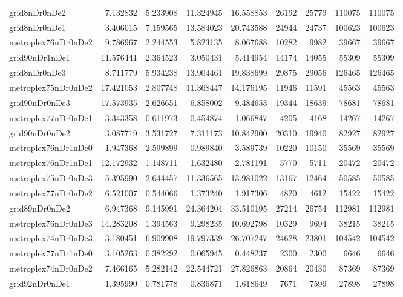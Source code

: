 \begin{longtable}{|l|r|r|r|r|r|r|r|r|}
grid8nDr0nDe2 & 7.132832 & 5.233908 & 11.324945 & 16.558853 & 26192 & 25779 & 110075 & 110075 \\
grid8nDr0nDe1 & 3.406015 & 7.159565 & 13.584023 & 20.743588 & 24944 & 24737 & 100623 & 100623 \\
metroplex76nDr0nDe2 & 9.786967 & 2.244553 & 5.823135 & 8.067688 & 10282 & 9982 & 39667 & 39667 \\
grid90nDr1nDe1 & 11.576441 & 2.364523 & 3.050431 & 5.414954 & 14174 & 14055 & 55309 & 55309 \\
grid8nDr0nDe3 & 8.711779 & 5.934238 & 13.904461 & 19.838699 & 29875 & 29056 & 126465 & 126465 \\
metroplex75nDr0nDe2 & 17.421053 & 2.807748 & 11.368447 & 14.176195 & 11946 & 11591 & 45563 & 45563 \\
grid90nDr0nDe3 & 17.573935 & 2.626651 & 6.858002 & 9.484653 & 19344 & 18639 & 78681 & 78681 \\
metroplex77nDr0nDe1 & 3.343358 & 0.611973 & 0.454874 & 1.066847 & 4205 & 4168 & 14267 & 14267 \\
grid90nDr0nDe2 & 3.087719 & 3.531727 & 7.311173 & 10.842900 & 20310 & 19940 & 82927 & 82927 \\
metroplex76nDr1nDe0 & 1.947368 & 2.599899 & 0.989840 & 3.589739 & 10220 & 10150 & 35569 & 35569 \\
metroplex76nDr1nDe1 & 12.172932 & 1.148711 & 1.632480 & 2.781191 & 5770 & 5711 & 20472 & 20472 \\
metroplex75nDr0nDe3 & 5.395990 & 2.644457 & 11.336565 & 13.981022 & 13167 & 12464 & 50585 & 50585 \\
metroplex77nDr0nDe2 & 6.521007 & 0.544066 & 1.373240 & 1.917306 & 4820 & 4612 & 15422 & 15422 \\
grid89nDr0nDe2 & 6.947368 & 9.145991 & 24.364204 & 33.510195 & 27214 & 26754 & 112981 & 112981 \\
metroplex76nDr0nDe3 & 14.283208 & 1.394563 & 9.298235 & 10.692798 & 10329 & 9694 & 38215 & 38215 \\
metroplex74nDr0nDe3 & 3.180451 & 6.909908 & 19.797339 & 26.707247 & 24628 & 23801 & 104542 & 104542 \\
metroplex77nDr1nDe0 & 3.105263 & 0.382292 & 0.065945 & 0.448237 & 2300 & 2300 & 6646 & 6646 \\
metroplex74nDr0nDe2 & 7.466165 & 5.282142 & 22.544721 & 27.826863 & 20864 & 20430 & 87369 & 87369 \\
grid92nDr0nDe1 & 1.395990 & 0.781778 & 0.836871 & 1.618649 & 7671 & 7599 & 27898 & 27898 \\

\end{longtable}
